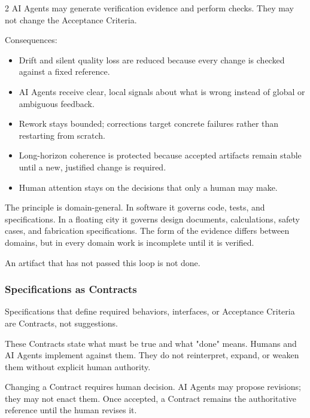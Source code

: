 \begin{multicols}{2}
AI Agents may generate verification evidence and perform checks. They may not change the Acceptance Criteria.

Consequences:

\begin{itemize}\setlength{\itemsep}{0pt}\setlength{\parskip}{0pt}

\item Drift and silent quality loss are reduced because every change is checked against a fixed reference.

\item AI Agents receive clear, local signals about what is wrong instead of global or ambiguous feedback.

\item Rework stays bounded; corrections target concrete failures rather than restarting from scratch.

\item Long-horizon coherence is protected because accepted artifacts remain stable until a new, justified change is required.

\item Human attention stays on the decisions that only a human may make.

\end{itemize}

The principle is domain-general. In software it governs code, tests, and specifications. In a floating city it governs design documents, calculations, safety cases, and fabrication specifications. The form of the evidence differs between domains, but in every domain work is incomplete until it is verified.

An artifact that has not passed this loop is not done.

\hypertarget{gp-SaC}{}

\subsubsection*{Specifications as Contracts}

Specifications that define required behaviors, interfaces, or Acceptance Criteria are Contracts, not suggestions.

These Contracts state what must be true and what "done" means. Humans and AI Agents implement against them. They do not reinterpret, expand, or weaken them without explicit human authority.

Changing a Contract requires human decision. AI Agents may propose revisions; they may not enact them. Once accepted, a Contract remains the authoritative reference until the human revises it.


\end{multicols}
